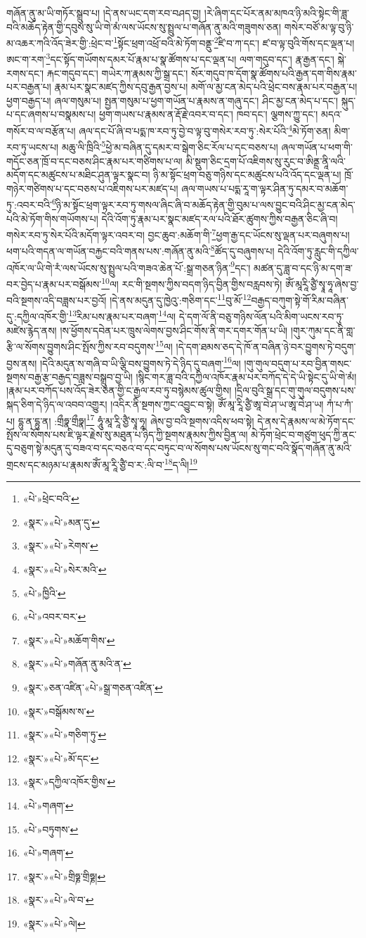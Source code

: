 གཞོན་ནུ་མ་ཡི་གཏོར་སྒྲུབ་པ། །དེ་ནས་ཡང་དག་རབ་བཤད་བྱ། །རེ་ཞིག་དང་པོར་ནམ་མཁའ་ཉི་མའི་སྟེང་གི་ཟླ་བའི་མཆོད་རྟེན་གྱི་དབུས་སུ་ཡི་གེ་མཾ་ལས་ཡོངས་སུ་སྤྲུལ་པ་གཞོན་ནུ་མའི་གཟུགས་ཅན། གསེར་བཙོ་མ་ལྟ་བུ་ཉི་མ་འཆར་ཀའི་འོད་ཟེར་གྱི་:ཕྲེང་བ་\footnote{«པེ་»ཕྲེང་བའི་}སྟོང་ཕྲག་འཕྲོ་བའི་མེ་ཏོག་བནྡུ་\footnote{«སྣར་»«པེ་»མན་དུ་}ཛི་བ་ཀ་དང་། ཛ་བ་ལྟ་བུའི་གོས་དང་ལྡན་པ། ཨང་ག་རག་\footnote{«སྣར་»«པེ་»རེགས་}དང་སྟོད་གཡོགས་དམར་པོ་རྣམ་པ་སྣ་ཚོགས་པ་དང་ལྡན་པ། ལག་གདུབ་དང་། རྣ་རྒྱན་དང་། སྐེ་རགས་དང་། རྐང་གདུབ་དང་། གཡེར་ཀ་རྣམས་ཀྱི་སྒྲ་དང་། སོར་གདུབ་ཁ་དོག་སྣ་ཚོགས་པའི་རྒྱན་དག་གིས་རྣམ་པར་བརྒྱན་པ། རྣམ་པར་སྣང་མཛད་ཀྱིས་དབུ་རྒྱན་བྱས་པ། མགོ་ལ་མྱ་ངན་མེད་པའི་ཕྲེང་བས་རྣམ་པར་བརྒྱན་པ། ཕྱག་བརྒྱད་པ། ཞལ་གསུམ་པ། སྤྱན་གསུམ་པ་ཕྱག་གཡོན་པ་རྣམས་ན་གཞུ་དང་། ཤིང་མྱ་ངན་མེད་པ་དང་། སྐུད་པ་དང་ཞགས་པ་བསྣམས་པ། ཕྱག་གཡས་པ་རྣམས་ན་རྡོ་རྗེ་འབར་བ་དང་། ཁབ་དང་། ལྕགས་ཀྱུ་དང་། མདའ་གསོར་བ་ལ་བརྩོན་པ། ཞལ་དང་པོ་ཞི་བ་པདྨ་ཁ་རབ་ཏུ་བྱེ་བ་ལྟ་བུ་གསེར་རབ་ཏུ་:སེར་པོའི་\footnote{«སྣར་»«པེ་»སེར་མའི་}མེ་ཏོག་ཅན། མིག་རབ་ཏུ་ཡངས་པ། མཆུ་ལི་ཁྲིའི་\footnote{«པེ་»ཁྱིའི་}ཕྱེ་མ་བཞིན་དུ་དམར་བ་སྒེག་ཅིང་རོལ་པ་དང་བཅས་པ། ཞལ་གཡོན་པ་ཕག་གི་གདོང་ཅན་ཁྲོ་བ་དང་བཅས་ཤིང་རྣམ་པར་གཙིགས་པ་ལ། མི་སྡུག་ཅིང་དྲག་པོ་འཇིགས་སུ་རུང་བ་ཨིནྡྲ་ནཱི་ལའི་མདོག་དང་མཚུངས་པ་མཐིང་ཤུན་ལྟར་སྣང་བ། ཉི་མ་སྟོང་ཕྲག་བཅུ་གཉིས་དང་མཚུངས་པའི་འོད་དང་ལྡན་པ། ཁྲོ་གཉེར་གཙིགས་པ་དང་བཅས་པ་འཇིགས་པར་མཛད་པ། ཞལ་གཡས་པ་པདྨ་རཱ་ག་ལྟར་ཤིན་ཏུ་དམར་བ་མཆོག་ཏུ་:འབར་བའི་\footnote{«པེ་»འབར་བར་}ཉི་མ་སྟོང་ཕྲག་ལྟར་རབ་ཏུ་གསལ་ཞིང་ཞི་བ་མཆོད་རྟེན་གྱི་བུམ་པ་ལས་བྱུང་བའི་ཤིང་མྱ་ངན་མེད་པའི་མེ་ཏོག་གིས་གཡོགས་པ། དེའི་འོག་ཏུ་རྣམ་པར་སྣང་མཛད་རལ་པའི་ཐོར་ཚུགས་ཀྱིས་བརྒྱན་ཅིང་ཞི་བ། གསེར་རབ་ཏུ་སེར་པོའི་མདོག་ལྟར་འབར་བ། བྱང་ཆུབ་:མཆོག་གི་\footnote{«སྣར་»«པེ་»མཆོག་གིས་}ཕྱག་རྒྱ་དང་ཡོངས་སུ་ལྡན་པར་བཞུགས་པ། ཕག་པའི་གདན་ལ་གཡོན་བརྐྱང་བའི་གནས་པས་:གཞོན་ནུ་མའི་\footnote{«སྣར་»«པེ་»གཞོན་ནུ་མའི་ན་}ཚོད་དུ་བཞུགས་པ། དེའི་འོག་ཏུ་རླུང་གི་དཀྱིལ་འཁོར་ལ་ཡི་གེ་རཾ་ལས་ཡོངས་སུ་སྤྲུལ་པའི་གཟའ་ཆེན་པོ་:སྒྲ་གཅན་ཉིན་\footnote{«སྣར་»ཅན་འཛིན་«པེ་»སྒྲ་གཅན་འཛིན་}དང་། མཚན་དུ་ཟླ་བ་དང་ཉི་མ་དག་ཟ་བར་བྱེད་པ་རྣམ་པར་བསྒོམས་\footnote{«སྣར་»བསྒོམས་ས་}ལ། རང་གི་སྔགས་ཀྱིས་བདག་ཉིད་བྱིན་གྱིས་བརླབས་ཏེ། ཨོཾ་མཱརཱི་ཙྱཻ་སྭཱ་ཧཱ་ཞེས་བྱ་བའི་སྔགས་འདི་བཟླས་པར་བྱའོ། །དེ་ནས་མདུན་དུ་ཁྱེའུ་:གཅིག་དང་\footnote{«སྣར་»«པེ་»གཅིག་ཏུ་}བུ་མོ་\footnote{«སྣར་»«པེ་»མོ་དང་}བརྒྱད་བཀུག་སྟེ་གོ་རིམ་བཞིན་དུ་:དཀྱིལ་འཁོར་གྱི་\footnote{«སྣར་»དཀྱིལ་འཁོར་གྱིས་}རིམ་པས་རྣམ་པར་བཞག་\footnote{«པེ་»གཞག་}ལ། དེ་དག་ལོ་ནི་བཅུ་གཉིས་ལོན་པའི་མིག་ཡངས་རབ་ཏུ་མཛེས་རྙེད་ནས། །ས་ཕྱོགས་དབེན་པར་ཁྲུས་ལེགས་བྱས་ཤིང་གོས་ནི་གར་དགར་གོན་པ་ཡི། །གུར་ཀུམ་དང་ནི་གླ་རྩི་ལ་སོགས་བྱུགས་ཤིང་སྤོས་ཀྱིས་རབ་བདུགས་\footnote{«པེ་»བཏུགས་}ལ། །དེ་དག་ཐམས་ཅད་དེ་ཁོ་ན་བཞིན་ཉེ་བར་བྱུགས་ཏེ་བདུག་བྱས་ནས། །དེའི་མདུན་ས་གཞི་བ་ཡི་ལྕི་བས་བྱུགས་ཏེ་དེ་ཉིད་དུ་བཞག་\footnote{«པེ་»གཞག་}ལ། །གུ་གུལ་བདུག་པ་རབ་བྱིན་གསང་སྔགས་བརྒྱ་རྩ་བརྒྱད་བཟླས་བསྒྲུབ་བྱ་ཡི། །སྙིང་གར་ཟླ་བའི་དཀྱིལ་འཁོར་རྣམ་པར་བཀོད་དེ་དེ་ཡི་སྟེང་དུ་ཡི་གེ་མཾ། །རྣམ་པར་བཀོད་པས་འོད་ཟེར་ཅན་གྱི་ང་རྒྱལ་རབ་ཏུ་བསྙེམས་ཚུལ་གྱིས། །དྲིལ་བུའི་སྒྲ་དང་གུ་གུལ་བདུགས་པས་སྐད་ཅིག་དེ་ཉིད་ལ་འབབ་འགྱུར། །འདིར་ནི་སྔགས་ཀྱང་འབྱུང་བ་སྟེ། ཨོཾ་མཱ་རཱི་ཙྱཻ་ཨཱ་བེ་ཤ་ཡ་ཨཱ་བེ་ཤ་ཡ། ཀཾ་པ་ཀཾ་པ། དྷུ་ན་དྷུ་ན། :གྲྀཧྣ་གྲྀཧྣ།\footnote{«སྣར་»«པེ་»གྲིཧྞ་གྲིཧྞ།} ཧཱུཾ་མཱ་རཱི་ཙྱཻ་སྭཱ་ཧཱ། ཞེས་བྱ་བའི་སྔགས་འདིས་ཕབ་སྟེ། དེ་ནས་དེ་རྣམས་ལ་མེ་ཏོག་དང་སྤོས་ལ་སོགས་པས་ཇི་ལྟར་རྗེས་སུ་མཐུན་པ་ཉིད་ཀྱི་སྔགས་རྣམས་ཀྱིས་བྱིན་ལ། མེ་ཏོག་ཕྲེང་བ་གཙུག་ཕུད་ཀྱི་ནང་དུ་བཅུག་སྟེ་མདུན་དུ་བཟའ་བ་དང་བཅའ་བ་དང་བཏུང་བ་ལ་སོགས་པས་ཡོངས་སུ་གང་བའི་སྣོད་གཞོན་ནུ་མའི་གྲངས་དང་མཉམ་པ་རྣམས་ཨོཾ་མཱ་རཱི་ཙྱཻ་བ་ར་:ལི་བ་\footnote{«སྣར་»«པེ་»ལེ་བ་}ད་ལི།\footnote{«སྣར་»«པེ་»ལེ།} 